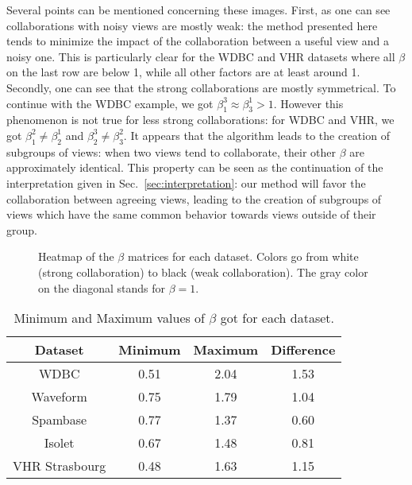 Several points can be mentioned concerning these images. First, as one can see collaborations with noisy views are mostly weak:  the method presented here tends to minimize the impact of the collaboration between a useful view and a noisy one. This is particularly clear for the WDBC and VHR datasets where all $\beta$ on the last row are below 1, while all other factors are at least around 1. Secondly, one can see that the strong collaborations are mostly symmetrical. To continue with the WDBC example, we got $\beta_1^3 \approx \beta_3^1 > 1$. However this phenomenon is not true for less strong collaborations: for WDBC and VHR, we got $\beta_1^2 \neq \beta_2^1$ and $\beta_2^3 \neq \beta_3^2$. It appears that the algorithm leads to the creation of subgroups of views: when two views tend to collaborate, their other $\beta$ are approximately identical. This property can be seen as the continuation of the interpretation given in Sec.~\ref{sec:interpretation}: our method will favor the collaboration between agreeing views, leading to the creation of subgroups of views which have the same common behavior towards views outside of their group.

\begin{figure}[!h]
	\centering

    \centering
	\caption{Heatmap of the $\beta$ matrices for each dataset. Colors go from white (strong collaboration) to black (weak collaboration). The gray color on the diagonal stands for $\beta=1$.}
\label{fig:betas}
\end{figure}

\begin{table}[htbp]
	\caption{Minimum and Maximum values of $\beta$ got for each dataset.}
\label{tab:minmax}
	\begin{center}
		\begin{tabular}{cccc}
			\toprule
			Dataset & Minimum & Maximum & Difference
			\\
			\midrule
			WDBC & 0.51 & 2.04 & 1.53\\
			Waveform & 0.75 & 1.79 & 1.04\\
			Spambase & 0.77 & 1.37 & 0.60\\
			Isolet & 0.67 & 1.48 & 0.81\\
			VHR Strasbourg & 0.48 & 1.63 & 1.15\\
			\bottomrule
		\end{tabular}
	\end{center}
\end{table}

